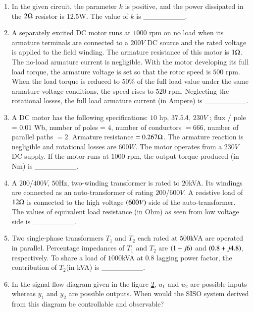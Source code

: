 \documentclass[journal]{IEEEtran}
\begin{document}
\begin{enumerate}
    \item In the given circuit, the parameter $k$ is positive, and the power dissipated in the $2 \ohm$ resistor is $12.5$W. The value of $k$ is \_\_\_\_\_\_\_\_.
        \begin{figure}[H]
            \centering
            
            \caption{}
            \label{fig57}
        \end{figure}

    \item A separately excited DC motor runs at $1000$ rpm on no load when its armature terminals are connected to a $200V$ DC source and the rated voltage is applied to the field winding. The armature resistance of this motor is $1  \ohm$. The no-load armature current is negligible. With the motor developing its full load torque, the armature voltage is set so that the rotor speed is $500$ rpm. When the load torque is reduced to $50\%$ of the full load value under the same armature voltage conditions, the speed rises to $520$ rpm. Neglecting the rotational losses, the full load armature current (in Ampere) is \_\_\_\_\_\_\_\_.
    \item A DC motor has the following specifications: $10$ hp, $37.5A$, $230V$ ; flux / pole = $0.01$ Wb, number of poles = $4$, number of conductors $=666$, number of parallel paths $=2$. Armature resistance $=0.267 \ohm$. The armature reaction is negligible and rotational losses are $600W$. The motor operates from a $230V$ DC supply. If the motor runs at $1000$ rpm, the output torque produced (in Nm) is \_\_\_\_\_\_\_\_.
    \item A $200$/$400 V$, $50$Hz, two-winding transformer is rated to $20$kVA. Its windings are connected as an auto-transformer of rating $200$/$600V$. A resistive load of $12 \ohm$ is connected to the high voltage $\left(600V\right)$ side of the auto-transformer. The values of equivalent load resistance (in Ohm) as seen from low voltage side is \_\_\_\_\_\_\_\_.
    \item Two single-phase transformers $T_1$ and $T_2$ each rated at $500$kVA are operated in parallel. Percentage impedances of $T_1$ and $T_2$ are $\left(1 + j6\right)$ and $\left(0.8 + j4.8\right)$, respectively. To share a load of $1000$kVA at $0.8$ lagging power factor, the contribution of $T_2$(in kVA) is \_\_\_\_\_\_\_\_.

    \item In the signal flow diagram given in the figure \ref{fig62}, $u_1$ and $u_2$ are possible inputs whereas $y_1$ and $y_2$ are possible outputs. When would the SISO system derived from this diagram be controllable and observable?
    \begin{figure}[H]
        \centering
        
        \caption{}
        \label{fig62}
    \end{figure}


\end{enumerate}
\end{document}
